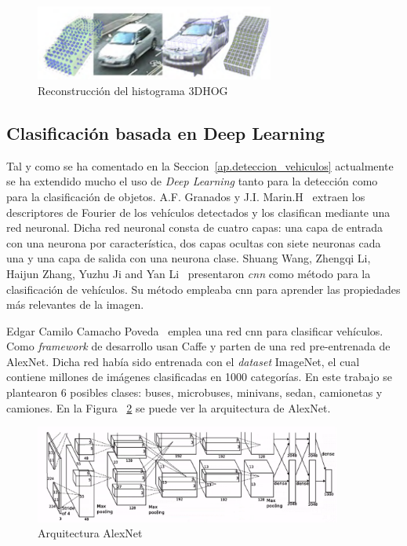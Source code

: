 \begin{figure}[H]
  \begin{center}
    \includegraphics[width=0.7\textwidth]{figures/Estado_arte/3dhog_plantilla.png}
		\caption{Reconstrucción  del  histograma  3DHOG}
		\label{fig.3dhog_histograma}
		\end{center}
\end{figure}

\subsection{Clasificación basada en Deep Learning}
Tal y como se ha comentado en la Seccion~\ref{ap.deteccion_vehiculos} actualmente se ha extendido mucho el uso de \textit{Deep Learning} tanto para la detección como para la clasificación de objetos. A.F. Granados y J.I. Marin.H~\cite{deteccion_flujo_vehicular} extraen los descriptores de Fourier de los vehículos detectados y los clasifican mediante una red neuronal. Dicha red neuronal consta de cuatro capas: una capa de entrada con una neurona por característica, dos capas ocultas con siete neuronas cada una y una capa de salida con una neurona clase. Shuang Wang, Zhengqi Li, Haijun Zhang, Yuzhu Ji and Yan Li~\cite{classify_vechicle_estado} presentaron \textit{\acrfull{cnn}} como método para la clasificación de vehículos. Su método empleaba \acrshort{cnn} para aprender las propiedades más relevantes de la imagen.


Edgar Camilo Camacho Poveda~\cite{edgar} emplea una red \acrshort{cnn} para clasificar vehículos. Como \textit{framework} de desarrollo usan Caffe y parten de una red pre-entrenada de AlexNet. Dicha red había sido entrenada con el \textit{dataset} ImageNet, el cual contiene millones de imágenes clasificadas en 1000 categorías. En este trabajo se plantearon 6 posibles clases: buses, microbuses, minivans, sedan, camionetas y camiones. En la Figura ~\ref{fig.alexnet} se puede ver la arquitectura de AlexNet.

 \begin{figure}[H] 
\begin{center}
	\includegraphics[width=0.9\textwidth]{figures/Estado_arte/AlexNet.png}
   \caption{Arquitectura AlexNet}
	\label{fig.alexnet}
\end{center}
\end{figure}



